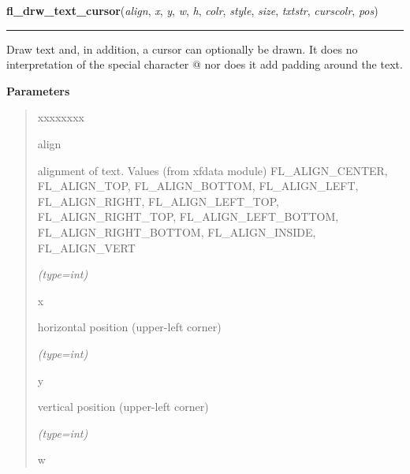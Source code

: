     \label{xformslib:flbasic:fl_drw_text_cursor}

    \vspace{0.5ex}

\hspace{.8\funcindent}\begin{boxedminipage}{\funcwidth}

    \raggedright \textbf{fl\_drw\_text\_cursor}(\textit{align}, \textit{x}, \textit{y}, \textit{w}, \textit{h}, \textit{colr}, \textit{style}, \textit{size}, \textit{txtstr}, \textit{curscolr}, \textit{pos})

    \vspace{-1.5ex}

    \rule{\textwidth}{0.5\fboxrule}
\setlength{\parskip}{2ex}
    Draw text and, in addition, a cursor can optionally be drawn. It does 
    no interpretation of the special character @ nor does it add padding 
    around the text.

\setlength{\parskip}{1ex}
      \textbf{Parameters}
      \vspace{-1ex}

      \begin{quote}
        \begin{Ventry}{xxxxxxxx}

          \item[align]

          alignment of text. Values (from xfdata module) FL\_ALIGN\_CENTER,
          FL\_ALIGN\_TOP, FL\_ALIGN\_BOTTOM, FL\_ALIGN\_LEFT, 
          FL\_ALIGN\_RIGHT, FL\_ALIGN\_LEFT\_TOP, FL\_ALIGN\_RIGHT\_TOP, 
          FL\_ALIGN\_LEFT\_BOTTOM, FL\_ALIGN\_RIGHT\_BOTTOM, 
          FL\_ALIGN\_INSIDE, FL\_ALIGN\_VERT

            {\it (type=int)}

          \item[x]

          horizontal position (upper-left corner)

            {\it (type=int)}

          \item[y]

          vertical position (upper-left corner)

            {\it (type=int)}

          \item[w]


\end{Ventry}
\end{quote}
\end{boxedminipage}
